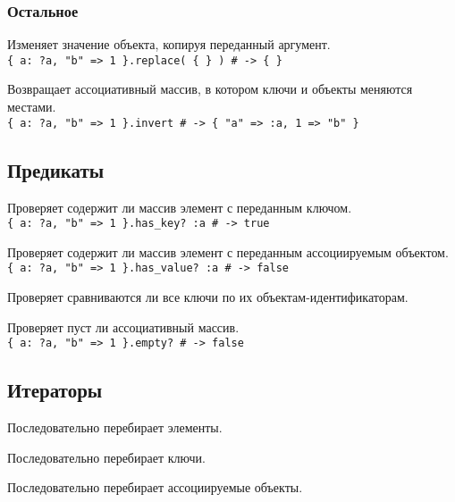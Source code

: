 \subsubsection*{Остальное} 

\begin{methodlist}
  Изменяет значение объекта, копируя переданный аргумент. 
  \\\verb!{ a: ?a, "b" => 1 }.replace( { } ) # -> { }!
 
  Возвращает ассоциативный массив, в котором ключи и объекты меняются местами.
  \\\verb!{ a: ?a, "b" => 1 }.invert # -> { "a" => :a, 1 => "b" }!
\end{methodlist}

\subsection*{Предикаты}

\begin{methodlist}
  Проверяет содержит ли массив элемент с переданным ключом. 
  \\\verb!{ a: ?a, "b" => 1 }.has_key? :a # -> true!
 
  Проверяет содержит ли массив элемент с переданным ассоциируемым объектом. 
  \\\verb!{ a: ?a, "b" => 1 }.has_value? :a # -> false!
 
  Проверяет сравниваются ли все ключи по их объектам-идентификаторам. 
 
  Проверяет пуст ли ассоциативный массив. 
  \\\verb!{ a: ?a, "b" => 1 }.empty? # -> false!
\end{methodlist} 

\subsection*{Итераторы} 

\begin{methodlist}
  Последовательно перебирает элементы. 
 
  Последовательно перебирает ключи. 
 
  Последовательно перебирает ассоциируемые объекты. 
\end{methodlist}

